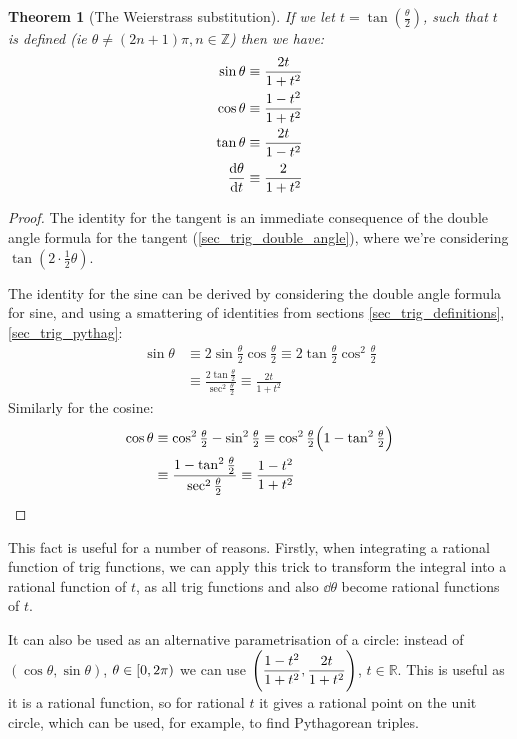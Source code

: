 \documentclass[fleqn,a4paper,11pt]{article}
\newcommand{\setstyle}{\mathbb}
\newcommand{\Integers}{\setstyle Z}
\newcommand{\Reals}{\setstyle R}
\newtheorem{theorem}{Theorem}[section]
\begin{document}
    \begin{theorem}[The Weierstrass substitution]
    If we let \(t = \tan(\frac \theta 2)\), such that \(t\) is defined (ie
    \(\theta \ne (2n + 1)\pi, n \in \Integers\)) then we have:
    \begin{align*}
    \sin \theta &\equiv \dfrac{2t}{1 + t^2} \\
    \cos \theta &\equiv \dfrac{1 - t^2}{1 + t^2} \\
    \tan \theta &\equiv \dfrac{2t}{1 - t^2} \\
    \dv{\theta}{t} &\equiv \dfrac{2}{1 + t^2}
    \end{align*}
    \end{theorem}
    \begin{proof}
    The identity for the tangent is an immediate consequence of the double
    angle formula for the tangent (\ref{sec_trig_double_angle}), where we're
    considering \(\tan(2 \cdot \frac 12 \theta)\).

    The identity for the sine can be derived by considering the double angle
    formula for sine, and using a smattering of identities from sections
    \ref{sec_trig_definitions}, \ref{sec_trig_pythag}:
    \begin{align*}
    \sin \theta &\equiv 2\sin \tfrac \theta 2 \cos\tfrac \theta 2
        \equiv 2\tan \tfrac \theta 2 \cos^2 \tfrac \theta 2 \\
        &\equiv \frac{2\tan \frac \theta 2}{\sec^2 \frac \theta 2}
        \equiv \frac{2t}{1 + t^2}
    \end{align*}
    Similarly for the cosine:
    \begin{align*}
    \cos \theta
        &\equiv \cos^2 \tfrac \theta 2 - \sin^2 \tfrac \theta 2
        \equiv \cos^2 \tfrac \theta 2
            \pqty{1 - \tan^2 \tfrac \theta 2} \\
        &\equiv \frac{1 - \tan^2 \tfrac \theta 2}
                     {\sec^2 \tfrac \theta 2}
        \equiv \frac{1 - t^2}{1 + t^2}
    \end{align*}
    \end{proof}

    This fact is useful for a number of reasons. Firstly, when integrating a
    rational function of trig functions, we can apply this trick to transform
    the integral into a rational function of \(t\), as all trig functions and
    also \(\dd{\theta}\) become rational functions of \(t\).

    It can also be used as an alternative parametrisation of a circle: instead
    of \((\cos\theta, \sin\theta)\), \(\theta \in \intco{0, 2\pi}\) we can use
    \(\pqty{\dfrac{1 - t^2}{1 + t^2}, \dfrac{2t}{1 + t^2}}\), \(t \in \Reals\).
    This is useful as it is a rational function, so for rational \(t\) it gives
    a rational point on the unit circle, which can be used, for example, to find
    Pythagorean triples.
\end{document}
